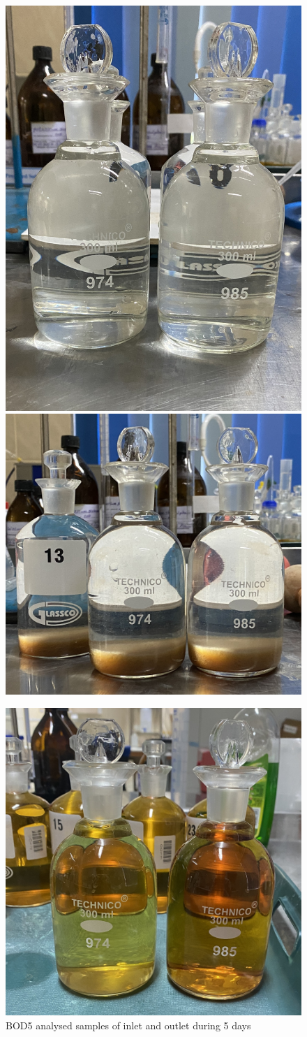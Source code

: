 \begin{figure}[H]
\centering

\includegraphics[width=.385\textwidth]{results/bod_before.JPG}\hfill
\includegraphics[width=.55\textwidth]{results/bod_precipitate.JPG}\hfill


\includegraphics[width=.5\textwidth]{results/bod_after.JPG}\hfill


\caption{\ac{BOD5} analysed samples of inlet and outlet during 5 days}
\label{fig: bod_before_after_samples}
\end{figure}